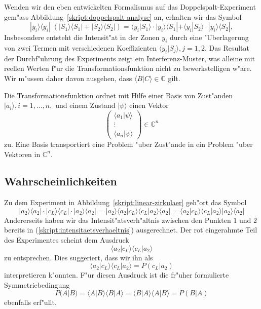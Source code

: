Wenden wir den eben entwickelten Formalismus auf das Doppelspalt-Experiment
gem"ass Abbildung~\ref{skript:doppelspalt-analyse} an, erhalten wir das Symbol
\[
|y_i\rangle \langle y_i|\; (|S_1\rangle\langle S_1| + |S_2\rangle \langle S_2|)
=
\langle y_i|S_1\rangle
\cdot
|y_i\rangle \langle S_1|
+
\langle y_i|S_2\rangle
\cdot
|y_i\rangle \langle S_2|,
\]
%
Insbesondere entsteht die Intensit"at in der Zonen $y_i$ durch eine
"Uberlagerung von zwei Termen mit verschiedenen
Koeffizienten $\langle y_i|S_j\rangle, j=1,2$.
Das Resultat der Durchf"uhrung des Experiments zeigt ein Interferenz-Muster,
was alleine mit reellen Werten f"ur die Transformationsfunktion nicht
zu bewerkstelligen w"are.
Wir m"ussen daher davon ausgehen, dass $\langle B|C\rangle\in\mathbb C$ gilt.

Die Transformationsfunktion ordnet mit Hilfe einer Basis von Zust"anden
$|a_i\rangle, i=1,\dots, n,$ und einem Zustand $|\psi\rangle$ einen Vektor
\[
\begin{pmatrix}
\langle a_1|\psi\rangle\\
\vdots\\
\langle a_n|\psi\rangle
\end{pmatrix}
\in\mathbb C^n
\]
zu.
Eine Basis transportiert eine Problem "uber Zust"ande in ein
Problem "uber Vektoren in $\mathbb C^n$.

\subsection{Wahrscheinlichkeiten}
Zu dem Experiment in Abbildung~\ref{skript:linear-zirkulaer} geh"ort das Symbol
\[
|a_2\rangle\langle a_2|\cdot
|c_L\rangle\langle c_L|\cdot
|a_2\rangle\langle a_2|
=
|a_2\rangle\langle a_2
|c_L\rangle\langle c_L
|a_2\rangle\langle a_2|
=
\langle a_2
|c_L\rangle\langle c_L
|a_2\rangle
|a_2\rangle
\langle a_2|
\]
Andererseits haben wir das Intensit"atsverh"altnis zwischen den Punkten
$1$ und $2$ bereits in (\ref{skript:intensitaetsverhaeltnis}) ausgerechnet.
Der rot eingerahmte Teil des Experimentes scheint dem Ausdruck
\[
\langle a_2
|c_L\rangle\langle c_L
|a_2\rangle
\]
zu entsprechen.
Dies suggeriert, dass wir ihn als
\[
\langle a_2
|c_L\rangle\langle c_L
|a_2\rangle
=
P(c_L|a_2) 
\]
interpretieren k"onnten. F"ur diesen Ausdruck ist die fr"uher formulierte
Symmetriebedingung 
\[
P(A|B)
=
\langle A |B\rangle
\langle B |A\rangle
=
\langle B |A\rangle
\langle A |B\rangle
=
P(B|A)
\]
ebenfalls erf"ullt.

